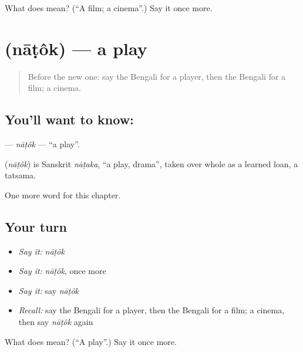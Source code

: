\begin{tcolorbox}[breakable,colback=teal!4,colframe=teal!35!black,title={Before you move on}]
What does  mean? (\textquotedblleft{}A film; a cinema\textquotedblright{}.) Say it once more.
\end{tcolorbox}
\section[\texorpdfstring{\bn{নাটক} (nāṭôk)}{নাটক (nāṭôk)}]{ (nāṭôk) — a play}

\label{lesson:BN-C225-natok}



\begin{quote}
Before the new one: say the Bengali for a player, then the Bengali for a film; a cinema.
\end{quote}

\subsection*{You'll want to know: }
\textbf{} — \emph{nāṭôk} — \textquotedblleft{}a play\textquotedblright{}.

\begin{cousinweb}
\textbf{} (\emph{nāṭôk}) is Sanskrit \emph{nāṭaka}, \textquotedblleft{}a play, drama\textquotedblright{}, taken over whole as a learned loan, a tatsama.
\end{cousinweb}

\begin{grammarlens}[title={What you've built}]
One more word for this chapter.
\end{grammarlens}

\subsection*{Your turn}
\begin{itemize}
\raggedright
  \item \emph{Say it:} \emph{nāṭôk}
  \item \emph{Say it:} \emph{nāṭôk}, once more
  \item \emph{Say it:} say \emph{nāṭôk}
  \item \emph{Recall:} say the Bengali for a player, then the Bengali for a film; a cinema, then say \emph{nāṭôk} again
\end{itemize}

\begin{tcolorbox}[breakable,colback=teal!4,colframe=teal!35!black,title={Before you move on}]
What does  mean? (\textquotedblleft{}A play\textquotedblright{}.) Say it once more.
\end{tcolorbox}
